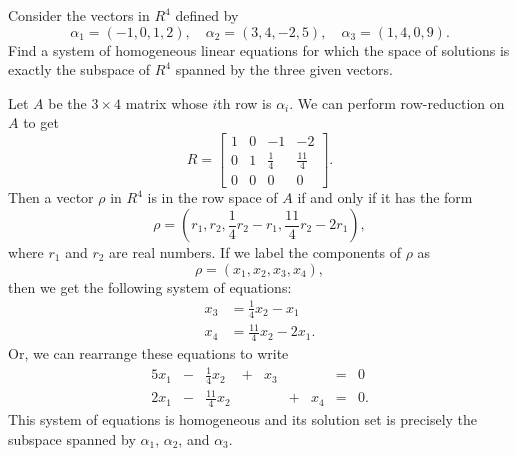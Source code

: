  Consider the vectors in $R^4$ defined by
\begin{equation*}
  \alpha_1 = (-1, 0, 1, 2), \quad
  \alpha_2 = (3, 4, -2, 5), \quad
  \alpha_3 = (1, 4, 0, 9).
\end{equation*}
Find a system of homogeneous linear equations for which the space of
solutions is exactly the subspace of $R^4$ spanned by the three given
vectors.
\begin{solution}
  Let $A$ be the $3\times4$ matrix whose $i$th row is $\alpha_i$. We
  can perform row-reduction on $A$ to get
  \begin{equation*}
    R =
    \begin{bmatrix}
      1 & 0 & -1 & -2 \\[3pt]
      0 & 1 & \frac14 & \frac{11}4 \\[3pt]
      0 & 0 & 0 & 0
    \end{bmatrix}.
  \end{equation*}
  Then a vector $\rho$ in $R^4$ is in the row space of $A$ if and only
  if it has the form
  \begin{equation*}
    \rho = \left(r_1, r_2, \frac14r_2 - r_1, \frac{11}4r_2 - 2r_1\right),
  \end{equation*}
  where $r_1$ and $r_2$ are real numbers. If we label the components
  of $\rho$ as
  \begin{equation*}
    \rho = (x_1,x_2,x_3,x_4),
  \end{equation*}
  then we get the following system of equations:
  \begin{align*}
    x_3 &= \frac14x_2 - x_1 \\
    x_4 &= \frac{11}4x_2 - 2x_1.
  \end{align*}
  Or, we can rearrange these equations to write
  \begin{alignat*}{5}
    x_1 &{}-{}& \frac14x_2 &{}+{}& x_3 && &{}={}& 0 \\
    2x_1 &{}-{}& \frac{11}4x_2 && &{}+{}& x_4 &{}={}& 0.
  \end{alignat*}
  This system of equations is homogeneous and its solution set is
  precisely the subspace spanned by $\alpha_1$, $\alpha_2$, and
  $\alpha_3$.
\end{solution}

